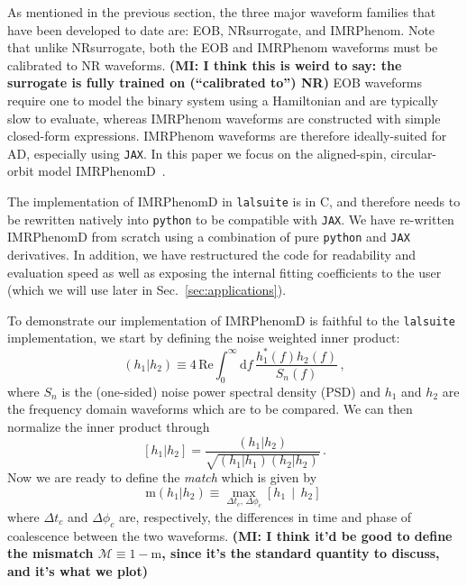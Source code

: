 \documentclass[twocolumn]{aastex631}
\newcommand{\jax}{\texttt{JAX}\xspace}
\newcommand{\lalsuite}{\texttt{lalsuite}\xspace}
\newcommand{\mi}[1]{\textbf{\color{teal}(MI: #1)}}
\begin{document}
As mentioned in the previous section, the three major waveform families that have been developed to date are:  EOB,  NRsurrogate, and IMRPhenom.
Note that unlike NRsurrogate, both the EOB and IMRPhenom waveforms must be calibrated to NR waveforms.
\mi{I think this is weird to say: the surrogate is fully trained on (``calibrated to'') NR}
EOB waveforms require one to model the binary system using a Hamiltonian and are typically slow to evaluate, whereas IMRPhenom waveforms are constructed with simple closed-form expressions.
IMRPhenom waveforms are therefore ideally-suited for AD, especially using \jax. 
In this paper we focus on the aligned-spin, circular-orbit model IMRPhenomD~\citep{Husa:2015iqa, Khan:2015jqa}.

The implementation of IMRPhenomD in \lalsuite is in C, and therefore needs to be rewritten natively into \texttt{python} to be compatible with \jax.
We have re-written IMRPhenomD from scratch using a combination of pure \texttt{python} and \jax derivatives.
In addition, we have restructured the code for readability and evaluation speed as well as exposing the internal fitting coefficients to the user (which we will use later in Sec.~\ref{sec:applications}).

To demonstrate our implementation of IMRPhenomD is faithful to the \lalsuite implementation, we start by defining the noise weighted inner product:
\begin{equation}
    \label{eq:inner_prod}
    \left(h_1|h_2\right) \equiv 4 \, \mathrm{Re} \int^{\infty}_{0} \mathrm{d} f \, \frac{ h^*_1(f) h_2(f)}{S_n(f)}\, ,
\end{equation}
where $S_n$ is the (one-sided) noise power spectral density (PSD) and $h_1$ and $h_2$ are the frequency domain waveforms which are to be compared.
We can then normalize the inner product through
\begin{equation}
    \left[h_1|h_2\right] = \frac{\left(h_1|h_2\right)}{\sqrt{\left(h_1|h_1\right)\left(h_2|h_2\right)}}\, .
\end{equation}
Now we are ready to define the \textit{match} which is given by 
\begin{equation}
    \mathrm{m}(h_1|h_2) \equiv \max_{\Delta t_c,\, \Delta \phi_c} \left[h_1 \, \middle| \, h_2 \right]\,
\end{equation}
where $\Delta t_c$ and $\Delta \phi_c$ are, respectively, the differences in time and phase of coalescence between the two waveforms.
\mi{I think it'd be good to define the mismatch $\mathcal{M} \equiv 1- \mathrm{m}$, since it's the standard quantity to discuss, and it's what we plot}
\end{document}
